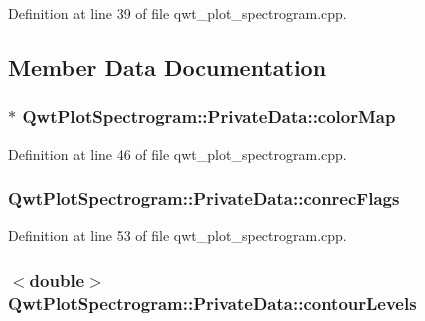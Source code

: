 Definition at line 39 of file qwt\-\_\-plot\-\_\-spectrogram.\-cpp.



\subsection{Member Data Documentation}
\hypertarget{class_qwt_plot_spectrogram_1_1_private_data_a979aec599cf08359740b6eb30f956910}{
\subsubsection[{color\-Map}]{$\ast$ Qwt\-Plot\-Spectrogram\-::\-Private\-Data\-::color\-Map}}\label{class_qwt_plot_spectrogram_1_1_private_data_a979aec599cf08359740b6eb30f956910}


Definition at line 46 of file qwt\-\_\-plot\-\_\-spectrogram.\-cpp.

\hypertarget{class_qwt_plot_spectrogram_1_1_private_data_a7c09476d3d3106c906cbc1fe7575bd32}{
\subsubsection[{conrec\-Flags}]{ Qwt\-Plot\-Spectrogram\-::\-Private\-Data\-::conrec\-Flags}}\label{class_qwt_plot_spectrogram_1_1_private_data_a7c09476d3d3106c906cbc1fe7575bd32}


Definition at line 53 of file qwt\-\_\-plot\-\_\-spectrogram.\-cpp.

\hypertarget{class_qwt_plot_spectrogram_1_1_private_data_a823d947870c43e7e5070b5b76f64ed76}{
\subsubsection[{contour\-Levels}]{$<${\bf double}$>$ Qwt\-Plot\-Spectrogram\-::\-Private\-Data\-::contour\-Levels}}\label{class_qwt_plot_spectrogram_1_1_private_data_a823d947870c43e7e5070b5b76f64ed76}


